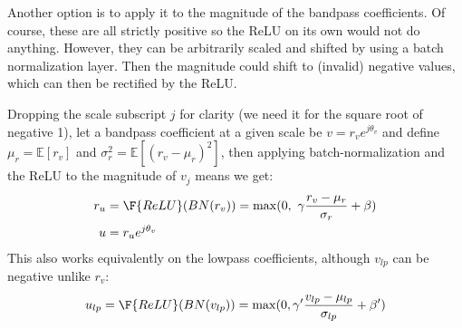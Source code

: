 Another option is to apply it to the magnitude of the bandpass coefficients. Of
course, these are all strictly positive so the ReLU on its own would not do
anything. However, they can be arbitrarily scaled and shifted by using a batch
normalization layer. Then the magnitude could shift to (invalid) negative
values, which can then be rectified by the ReLU.

Dropping the scale subscript $j$ for clarity (we need it for the square root of 
negative 1), let a bandpass coefficient at a given scale be
$v = r_v e^{j\theta_v}$ and define
$\mu_r = \mathbb{E}[r_v]$ and $\sigma_r^2 = \mathbb{E}[(r_v-\mu_r)^2]$, then
applying batch-normalization and the ReLU to the magnitude of $v_j$ means we
get:
\begin{align}
  r_u &= \F{ReLU}(BN(r_v)) = \max(0,\ \gamma \frac{r_v-\mu_r}{\sigma_r} + \beta) \label{eq:ch6:magrelu_bp} \\
  u &= r_u e^{j\theta_v} \label{eq:ch6:magrelu_bp2}
\end{align}
This also works equivalently on the lowpass coefficients, although $v_{lp}$ can
be negative unlike $r_v$:
\begin{equation}
  u_{lp} = \F{ReLU}(BN(v_{lp})) = \max(0, \gamma' \frac{v_{lp} - \mu_{lp}}{\sigma_{lp}} + \beta') \label{eq:ch6:bnrelu_lp}
\end{equation}
%
